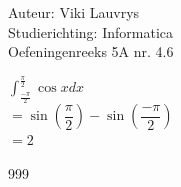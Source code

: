 \documentclass[a4paper]{article}
\begin{document}
  
\noindent \large Auteur: Viki	Lauvrys \\
\noindent \large Studierichting: Informatica\\
\noindent \large Oefeningenreeks 5A nr. 4.6\\

\medskip

\normalsize

$ \displaystyle\int^{\tfrac{\pi}{2}}_{\tfrac{-\pi}{2}} \cos x dx $ \\

$ = \sin\left( \dfrac{\pi}{2} \right) - \sin \left( \dfrac{- \pi}{2} \right) $ \\

$ = 2 $ \\

\begin{thebibliography}{999}
\end{thebibliography}
\end{document}
